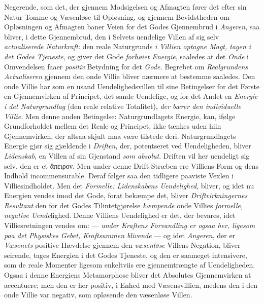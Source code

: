 Negerende, som det, der gjennem Modsigelsen og Afmagten fører det efter sin Natur
Tomme og Væsenløse til Opløsning, og gjennem Bevidstheden om Opløsningen og
Afmagten baner Veien for det Godes Gjennembrud i \emph{Angeren}, saa bliver, i
dette Gjennembrud, den i Selvets uendelige Villen af sig selv \emph{actualiserede
Naturkraft:} den reale Naturgrunds \emph{i Villien optagne Magt, tagen i det
Godes Tjeneste}, og giver det Gode \emph{forhøiet Energie}, saaledes at det
\emph{Onde} i Omvendelsen faaer \emph{positiv} Betydning for det \emph{Gode.}
 Begrebet om \emph{Realgrundens Actualiseren} gjennem den onde Villie bliver
nærmere at bestemme saaledes. Den onde Villie har som en usand
Uendelighedsvillen til sine Betingelser for det Første en Gjennemvirken af
Principet, det sande Uendelige, og for det Andet en \emph{Energie i det
Naturgrundlag} (den reale relative Totalitet), \emph{der bærer den individuelle
Villie.} Men denne anden Betingelse: Naturgrundlagets Energie, kan, ifølge
Grundforholdet mellem det Reale og Principet, ikke tænkes uden hiin
Gjennemvirken, der altsaa skjult maa være tilstede deri. Naturgrundlagets Energie
gjør sig gjældende i \emph{Driften}, der, potentseret ved Uendeligheden, bliver
\emph{Lidenskab}, en Villen af sin Gjenstand \emph{som absolut}. Driften vil her
uendeligt sig selv, den er et ἄπειρον. Men under denne Drift-Stræben ere Villiens
Form og dens Indhold incommensurable. Deraf følger saa den tidligere paaviste
Vexlen i Villiesindholdet. Men det \emph{Formelle: Lidenskabens Uendelighed},
bliver, og idet nu Energien vendes imod det Gode, forat bekæmpe det, bliver
\emph{Driftvirkningernes Resultant} den for det Godes Tilintetgjørelse
\emph{kæmpende} onde Villies \emph{formelle, negative Uende}lighed. Denne
Villiens Uendelighed er det, der bevares, idet Villiesretningen vendes om: ---
\emph{under Kraftens Forvandling er ogsaa her, ligesom paa det Physiskes Gebet,
Kraftsummen blivende} --- og idet \emph{Angeren}, der er \emph{Væsenets} positive
Hævdelse gjennem den \emph{væsenløse} Villens Negation, bliver seirende, tages
Energien i det Godes Tjeneste, og den er saameget intensivere, som de reale
Momenter ligesom enkeltviis ere gjennemtrængte af Uendeligheden. Ogsaa i denne
Energiens Metamorphose bliver det Absolutes Gjennemvirken at accentuere; men den
er her positiv, i Enhed med Væsensvillien, medens den i den onde Villie var
negativ, som opløsende den væsenløse Villen.

